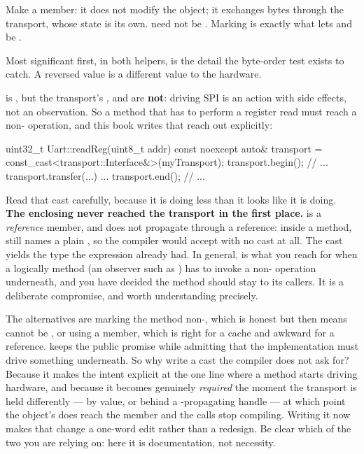 Make  a  member: it does not modify the  object; it exchanges
bytes through the transport, whose state is its own.  need not be .
Marking   is exactly what lets  and  be
.

Most significant first, in both helpers, is the detail the byte-order test exists to catch. A
reversed value is a different value to the hardware.

 is , but the transport's ,  and
 are \textbf{not}: driving SPI is an action with side effects, not an observation. So a
 method that has to perform a register read must reach a non- operation, and
this book writes that reach out explicitly:

\begin{cppcode}
uint32_t Uart::readReg(uint8_t addr) const noexcept
{
    auto& transport = const_cast<transport::Interface&>(myTransport);
    transport.begin();
    // ... transport.transfer(...) ...
    transport.end();
    // ...
}
\end{cppcode}

\noindent Read that cast carefully, because it is doing less than it looks like it is doing.
\textbf{The enclosing  never reached the transport in the first place.}
 is a \emph{reference} member, and  does not propagate through a
reference: inside a  method,  still names a plain
, so the compiler would accept  with no cast
at all. The cast yields the type the expression already had. In general,  is what
you reach for when a logically  method (an observer such as ) has to
invoke a non- operation underneath, and you have decided the method should stay
 to its callers. It is a deliberate compromise, and worth understanding precisely.

The alternatives are marking the method non-, which is honest but then means
 cannot be , or using a  member, which is right for a cache
and awkward for a reference.  keeps the public  promise while admitting
that the implementation must drive something underneath. So why write a cast the compiler does not
ask for? Because it makes the intent explicit at the one line where a  method starts
driving hardware, and because it becomes genuinely \emph{required} the moment the transport is held
differently --- by value, or behind a -propagating handle --- at which point the object's
 does reach the member and the calls stop compiling. Writing it now makes that change a
one-word edit rather than a redesign. Be clear which of the two you are relying on: here it is
documentation, not necessity.

